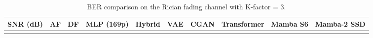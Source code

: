 \begin{longtable}[]{@{}
  >{\raggedright\arraybackslash}p{}
  >{\raggedright\arraybackslash}p{}
  >{\raggedright\arraybackslash}p{}
  >{\raggedright\arraybackslash}p{}
  >{\raggedright\arraybackslash}p{}
  >{\raggedright\arraybackslash}p{}
  >{\raggedright\arraybackslash}p{}
  >{\raggedright\arraybackslash}p{}
  >{\raggedright\arraybackslash}p{}
  >{\raggedright\arraybackslash}p{}@{}}
\caption{BER comparison on the Rician fading channel with K-factor = 3.}\label{tbl:table3}\tabularnewline
\toprule\noalign{}
\begin{minipage}[b]{\linewidth}\raggedright
SNR (dB)
\end{minipage} & \begin{minipage}[b]{\linewidth}\raggedright
AF
\end{minipage} & \begin{minipage}[b]{\linewidth}\raggedright
DF
\end{minipage} & \begin{minipage}[b]{\linewidth}\raggedright
MLP (169p)
\end{minipage} & \begin{minipage}[b]{\linewidth}\raggedright
Hybrid
\end{minipage} & \begin{minipage}[b]{\linewidth}\raggedright
VAE
\end{minipage} & \begin{minipage}[b]{\linewidth}\raggedright
CGAN
\end{minipage} & \begin{minipage}[b]{\linewidth}\raggedright
Transformer
\end{minipage} & \begin{minipage}[b]{\linewidth}\raggedright
Mamba S6
\end{minipage} & \begin{minipage}[b]{\linewidth}\raggedright
Mamba-2 SSD
\end{minipage} \\
\midrule\noalign{}
\endfirsthead
\toprule\noalign{}
\begin{minipage}[b]{\linewidth}\raggedright

\end{minipage}
\end{longtable}
